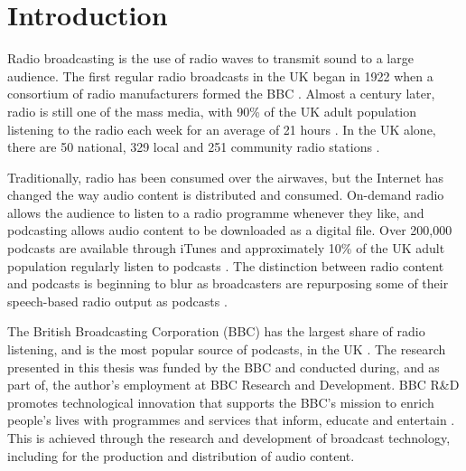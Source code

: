 \chapter{Introduction}\label{sec:intro}

Radio broadcasting is the use of radio waves to transmit sound to a large audience.  The first regular radio broadcasts
in the UK began in 1922 when a consortium of radio manufacturers formed the BBC \citep{BBC2015}.
Almost a century later, radio is still one of the mass media, with 90\% of the UK adult population listening to the
radio each week for an average of 21 hours \citep{RAJAR2017a}.  In the UK alone, there are 50 national, 329 local and
251 community radio stations \citep[pp. 6, 127]{Ofcom2017}.

Traditionally, radio has been consumed over the airwaves, but the Internet has changed the way audio content is
distributed and consumed.  On-demand radio allows the audience to listen to a radio programme whenever they like, and
podcasting allows audio content to be downloaded as a digital file. Over 200,000 podcasts are available through iTunes
\citep{Morgan2015} and approximately 10\% of the UK adult population regularly listen to podcasts \citep{RAJAR2017}.
The distinction between radio content and podcasts is beginning to blur as broadcasters are repurposing some of their
speech-based radio output as podcasts \citep[p.~98]{Ofcom2017}.

The British Broadcasting Corporation (BBC) has the largest share of radio listening, and is the most popular source of
podcasts, in the UK \citep[p. 107]{Ofcom2017}.
The research presented in this thesis was funded by the BBC and conducted during, and as part of, the author's
employment at BBC Research and Development.  BBC R\&D promotes technological innovation that supports the
BBC's mission to enrich people's lives with programmes and services that inform, educate and entertain \citep[art.
15]{BBCCharter2016}.  This is achieved through the research and development of broadcast technology, including for the
production and distribution of audio content.

